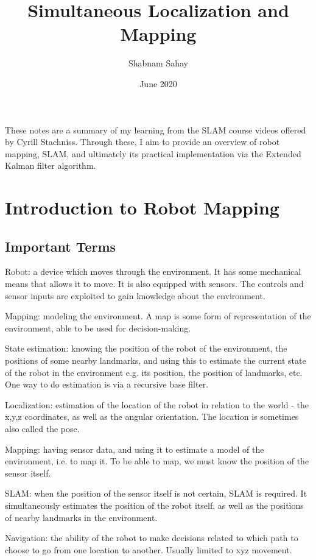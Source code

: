 \documentclass[a4paper]{article}
\title{Simultaneous Localization and Mapping}
\author{Shabnam Sahay}
\date{June 2020}
\begin{document}
\maketitle

These notes are a summary of my learning from the SLAM course videos offered by Cyrill Stachniss. Through these, I aim to provide an overview of robot mapping, SLAM, and ultimately its practical implementation via the Extended Kalman filter algorithm.


\section{Introduction to Robot Mapping}

\subsection{Important Terms}

Robot: a device which moves through the environment. It has some mechanical means that allows it to move. It is also equipped with sensors. The controls and sensor inputs are exploited to gain knowledge about the environment.

Mapping: modeling the environment. A map is some form of representation of the environment, able to be used for decision-making.

State estimation: knowing the position of the robot of the environment, the positions of some nearby landmarks, and using this to estimate the current state of the robot in the environment e.g. its position, the position of landmarks, etc. One way to do estimation is via a recursive base filter.

Localization: estimation of the location of the robot in relation to the world - the x,y,z coordinates, as well as the angular orientation. The location is sometimes also called the pose.

Mapping: having sensor data, and using it to estimate a model of the environment, i.e. to map it. To be able to map, we must know the position of the sensor itself.

SLAM: when the position of the sensor itself is not certain, SLAM is required. It simultaneously estimates the position of the robot itself, as well as the positions of nearby landmarks in the environment.

Navigation: the ability of the robot to make decisions related to which path to choose to go from one location to another. Usually limited to xyz movement.
\end{document}
